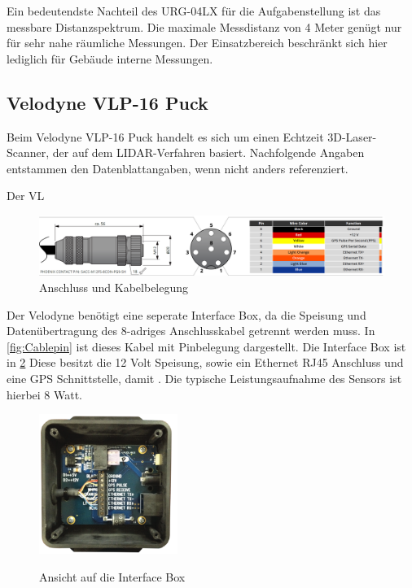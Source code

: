 Ein bedeutendste Nachteil des URG-04LX für die Aufgabenstellung ist das messbare Distanzspektrum. Die maximale Messdistanz von 4 Meter genügt nur für sehr nahe räumliche Messungen. Der Einsatzbereich beschränkt sich hier lediglich für Gebäude interne Messungen.

\subsection{Velodyne VLP-16 Puck}
\label{subsec:Velodyne}
Beim Velodyne VLP-16 Puck handelt es sich um einen Echtzeit 3D-Laser-Scanner, der auf dem \ac{LIDAR}-Verfahren basiert. Nachfolgende Angaben entstammen den Datenblattangaben, wenn nicht anders referenziert.

Der VL

\begin{figure}[H]
	\centering
	\includegraphics[width=1\textwidth]{resources/Cablepins.PNG}
	\caption[Anschluss und Kabelbelegung]{Anschluss und Kabelbelegung}
	\label{fig:CablePin}
\end{figure} 

Der Velodyne benötigt eine seperate Interface Box, da die Speisung und Datenübertragung des 8-adriges Anschlusskabel getrennt werden muss. In \ref{fig:Cablepin} ist dieses Kabel mit Pinbelegung dargestellt. Die Interface Box ist in \ref{fig:InterfaceBox}  Diese besitzt die 12 Volt Speisung, sowie ein Ethernet RJ45 Anschluss und eine \ac{GPS} Schnittstelle, damit . Die typische Leistungsaufnahme des Sensors ist hierbei 8 Watt.

\begin{figure}[H]
	\centering
	\includegraphics[width=0.4\textwidth]
	{resources/InterfaceBox.PNG}
	\caption[Ansichct auf die Interfacebox]{Ansicht auf die Interface Box} \protect\cite{Velodyne}
	\label{fig:InterfaceBox}
\end{figure}



